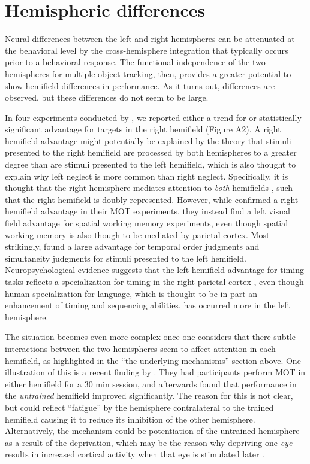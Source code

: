 \documentclass[
]{book}
\begin{document}
\hypertarget{hemispheric-differences}{%
\section{Hemispheric differences}\label{hemispheric-differences}}

Neural differences between the left and right hemispheres can be attenuated at the behavioral level by the cross-hemisphere integration that typically occurs prior to a behavioral response. The functional independence of the two hemispheres for multiple object tracking, then, provides a greater potential to show hemifield differences in performance. As it turns out, differences are observed, but these differences do not seem to be large.

In four experiments conducted by \citet{holcombeObjectTrackingAbsence2014}, we reported either a trend for or statistically significant advantage for targets in the right hemifield (Figure A2). A right hemifield advantage might potentially be explained by the theory that stimuli presented to the right hemifield are processed by both hemispheres to a greater degree than are stimuli presented to the left hemifield, which is also thought to explain why left neglect is more common than right neglect. Specifically, it is thought that the right hemisphere mediates attention to \emph{both} hemifields \citep{mesulamSpatialAttentionNeglect1999}, such that the right hemifield is doubly represented. However, while \citet{strongHemifieldspecificControlSpatial2020} confirmed a right hemifield advantage in their MOT experiments, they instead find a left visual field advantage for spatial working memory experiments, even though spatial working memory is also though to be mediated by parietal cortex. Most strikingly, \citet{matthewsLeftVisualField2015} found a large advantage for temporal order judgments and simultaneity judgments for stimuli presented to the left hemifield. Neuropsychological evidence suggests that the left hemifield advantage for timing tasks reflects a specialization for timing in the right parietal cortex \citep{battelliBilateralDeficitsTransient2003}, even though human specialization for language, which is thought to be in part an enhancement of timing and sequencing abilities, has occurred more in the left hemisphere.

The situation becomes even more complex once one considers that there subtle interactions between the two hemispheres seem to affect attention in each hemifield, as highlighted in the ``the underlying mechanisms'' section above. One illustration of this is a recent finding by \citet{edwardsBehavioralGainFollowing2021}. They had participants perform MOT in either hemifield for a 30 min session, and afterwards found that performance in the \emph{untrained} hemifield improved significantly. The reason for this is not clear, but could reflect ``fatigue'' by the hemisphere contralateral to the trained hemifield causing it to reduce its inhibition of the other hemisphere. Alternatively, the mechanism could be potentiation of the untrained hemisphere as a result of the deprivation, which may be the reason why depriving one \emph{eye} results in increased cortical activity when that eye is stimulated later \citep{lunghiBriefPeriodsMonocular2011}.
\end{document}
